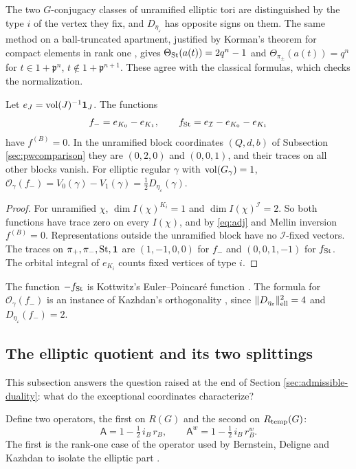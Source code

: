 The two $G$-conjugacy classes of unramified elliptic tori are distinguished by the type $i$ of the vertex they fix, and $D_{\eta_\varepsilon}$ has opposite signs on them. The same method on a ball-truncated apartment, justified by Korman's theorem for compact elements in rank one \cite{Ko04}, gives $\Theta_{\operatorname{St}}(a(t))=2q^n-1$ and $\Theta_{\pi_\pm}(a(t))=q^n$ for $t\in1+\mathfrak p^n$, $t\notin 1+\mathfrak p^{n+1}$. These agree with the classical formulas, which checks the normalization.

\begin{proposition}\label{prop:pseudo}Let $e_J=\operatorname{vol}(J)^{-1}\mathbf 1_J$. The functions
\[
f_-=e_{K_0}-e_{K_1},\qquad f_{\operatorname{St}}=e_{\mathcal I}-e_{K_0}-e_{K_1}
\]
have $f^{(B)}=0$. In the unramified block coordinates $(Q,d,b)$ of Subsection \ref{sec:pwcomparison} they are $(0,2,0)$ and $(0,0,1)$, and their traces on all other blocks vanish. For elliptic regular $\gamma$ with $\operatorname{vol}(G_\gamma)=1$, $\mathcal O_\gamma(f_-)=V_0(\gamma)-V_1(\gamma)=\tfrac12D_{\eta_\varepsilon}(\gamma)$.
\end{proposition}
\begin{proof}
For unramified $\chi$, $\dim I(\chi)^{K_i}=1$ and $\dim I(\chi)^{\mathcal I}=2$. So both functions have trace zero on every $I(\chi)$, and by \eqref{eq:adj} and Mellin inversion $f^{(B)}=0$. Representations outside the unramified block have no $\mathcal I$-fixed vectors. The traces on $\pi_+,\pi_-,\operatorname{St},\mathbf 1$ are $(1,-1,0,0)$ for $f_-$ and $(0,0,1,-1)$ for $f_{\operatorname{St}}$. The orbital integral of $e_{K_i}$ counts fixed vertices of type $i$.
\end{proof}
The function $-f_{\operatorname{St}}$ is Kottwitz's Euler--Poincar\'e function \cite{Ko88}. The formula for $\mathcal O_\gamma(f_-)$ is an instance of Kazhdan's orthogonality \cite{Ka86,SS97}, since $\|D_{\eta_\varepsilon}\|^2_{\rm ell}=4$ and $D_{\eta_\varepsilon}(f_-)=2$.

\subsection{The elliptic quotient and its two splittings}\label{sub:split}
This subsection answers the question raised at the end of Section \ref{sec:admissible-duality}: what do the exceptional coordinates characterize?

Define two operators, the first on $R(G)$ and the second on $R_{\rm temp}(G)$:
\[
\mathsf A=1-\tfrac12\,i_B\,r_B,\qquad \mathsf A^w=1-\tfrac12\,i_B\,r_B^w .
\]
The first is the rank-one case of the operator used by Bernstein, Deligne and Kazhdan to isolate the elliptic part \cite{BDK86,Da00}.

